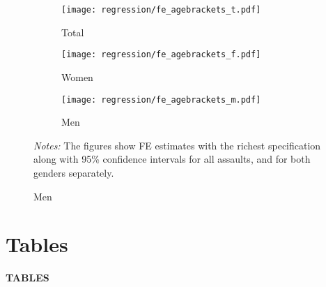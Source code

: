 \documentclass[11pt, a4paper, draft]{article} %
\begin{document}
\begin{landscape}
	\vspace*{\fill}
	\begin{figure}[H]\centering
		\caption{The age profile of the effect}\label{fig_soc_ext:fe_age_profile}
		\begin{subfigure}[h]{0.31\linewidth}\centering\caption{Total}
			\texttt{[image: regression/fe\_agebrackets\_t.pdf]}
		\end{subfigure}
		\begin{subfigure}[h]{0.31\linewidth}\centering\caption{Women}
			\texttt{[image: regression/fe\_agebrackets\_f.pdf]}
		\end{subfigure}
		\begin{subfigure}[h]{0.31\linewidth}\centering\caption{Men}
			\texttt{[image: regression/fe\_agebrackets\_m.pdf]}
		\end{subfigure}
		\scriptsize
		\begin{minipage}{\linewidth}
			\emph{Notes:} The figures show FE estimates with the richest specification along with 95\% confidence intervals for all assaults, and for both genders separately. 
		\end{minipage}
	\end{figure}
	\vspace*{\fill}\clearpage
\end{landscape}



\newpage
\TODO\section{Tables}
\vspace*{\fill}
{\Huge \begin{center}\textbf{TABLES}\end{center}}
\vspace*{\fill}\clearpage
\end{document}
